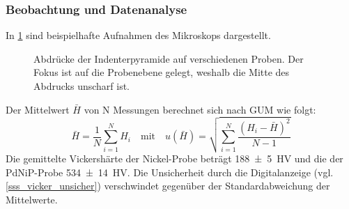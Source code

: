 \documentclass[
	a4paper,
	12pt,
	pagesize,
	ngerman
]{scrartcl}
\begin{document}
	\subsubsection{Beobachtung und Datenanalyse}
	In \cref{fig_indents} sind beispielhafte Aufnahmen des Mikroskops dargestellt.
	\begin{figure}[H]
		\centering
			\caption{Abdrücke der Indenterpyramide auf verschiedenen Proben. Der Fokus ist auf die Probenebene gelegt, weshalb die Mitte des Abdrucks unscharf ist.}
			\label{fig_indents}
 \end{figure}
 Der Mittelwert $\bar{H}$ von N Messungen berechnet sich nach GUM wie folgt:
 \begin{equation}
	 \bar{H} = \frac{1}{N}\sum_{i=1}^N H_i \quad \text{mit} \quad u(\bar{H}) = \sqrt{\sum_{i=1}^N \frac{(H_i-\bar{H})^2}{N-1}}
 \end{equation}
 Die gemittelte Vickershärte der Nickel-Probe beträgt \SI{188+-5}{HV} und die der PdNiP-Probe \SI{534+-14}{HV}.
 Die Unsicherheit durch die Digitalanzeige (vgl. \ref{sss_vicker_unsicher}) verschwindet gegenüber der Standardabweichung der Mittelwerte.
\end{document}
